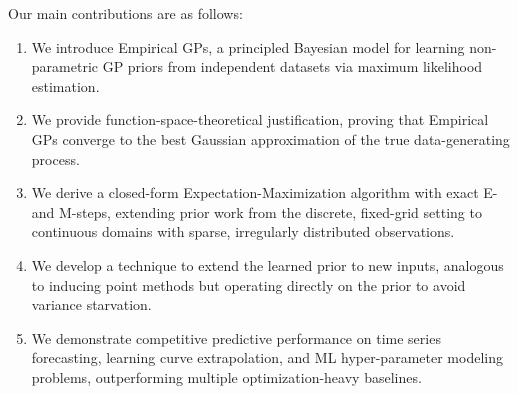 \documentclass{article}
\newcommand{\claude}[1]{{\color{claudepurple}\textbf{[Claude: #1]}}}
\begin{document}



Our main contributions are as follows:
\begin{enumerate}[leftmargin=14pt, labelwidth=!, labelindent=0pt, itemsep=0.8pt]
    \item We introduce Empirical GPs, a principled Bayesian model for learning non-parametric GP priors from independent datasets via maximum likelihood estimation.
    \item We provide function-space-theoretical justification, proving that Empirical GPs converge to the best Gaussian approximation of the true data-generating process.
    \item We derive a closed-form Expectation-Maximization algorithm with exact E- and M-steps, extending prior work from the discrete, fixed-grid setting to continuous domains with sparse, irregularly distributed observations.
    \item We develop a technique to extend the learned prior to new inputs, analogous to inducing point methods but operating directly on the prior to avoid variance starvation.
    \item We demonstrate competitive predictive performance on time series forecasting,
    learning curve extrapolation,
    and ML hyper-parameter modeling problems,
    outperforming multiple optimization-heavy baselines.
\end{enumerate}
\end{document}
